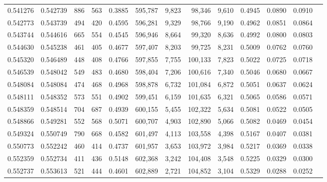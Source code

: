 \begin{tabular}{rrrrrrrrrrrrr}
0.541276 & 0.542739 &    886 &   563 &                                     0.3885 & 595,787 &   9,823 &  98,346 &   9,610 & 0.4945 & 0.0890 & 0.0910 \\
0.542773 & 0.543739 &    494 &   420 &                                     0.4595 & 596,281 &   9,329 &  98,766 &   9,190 & 0.4962 & 0.0851 & 0.0864 \\
0.543744 & 0.544616 &    665 &   554 &                                     0.4545 & 596,946 &   8,664 &  99,320 &   8,636 & 0.4992 & 0.0800 & 0.0803 \\
0.544630 & 0.545238 &    461 &   405 &                                     0.4677 & 597,407 &   8,203 &  99,725 &   8,231 & 0.5009 & 0.0762 & 0.0760 \\
0.545320 & 0.546489 &    448 &   408 &                                     0.4766 & 597,855 &   7,755 & 100,133 &   7,823 & 0.5022 & 0.0725 & 0.0718 \\
0.546539 & 0.548042 &    549 &   483 &                                     0.4680 & 598,404 &   7,206 & 100,616 &   7,340 & 0.5046 & 0.0680 & 0.0667 \\
0.548084 & 0.548084 &    474 &   468 &                                     0.4968 & 598,878 &   6,732 & 101,084 &   6,872 & 0.5051 & 0.0637 & 0.0624 \\
0.548111 & 0.548352 &    573 &   551 &                                     0.4902 & 599,451 &   6,159 & 101,635 &   6,321 & 0.5065 & 0.0586 & 0.0571 \\
0.548359 & 0.548514 &    704 &   687 &                                     0.4939 & 600,155 &   5,455 & 102,322 &   5,634 & 0.5081 & 0.0522 & 0.0505 \\
0.548866 & 0.549281 &    552 &   568 &                                     0.5071 & 600,707 &   4,903 & 102,890 &   5,066 & 0.5082 & 0.0469 & 0.0454 \\
0.549324 & 0.550749 &    790 &   668 &                                     0.4582 & 601,497 &   4,113 & 103,558 &   4,398 & 0.5167 & 0.0407 & 0.0381 \\
0.550773 & 0.552242 &    460 &   414 &                                     0.4737 & 601,957 &   3,653 & 103,972 &   3,984 & 0.5217 & 0.0369 & 0.0338 \\
0.552359 & 0.552734 &    411 &   436 &                                     0.5148 & 602,368 &   3,242 & 104,408 &   3,548 & 0.5225 & 0.0329 & 0.0300 \\
0.552737 & 0.553613 &    521 &   444 &                                     0.4601 & 602,889 &   2,721 & 104,852 &   3,104 & 0.5329 & 0.0288 & 0.0252 \\

\end{tabular}
